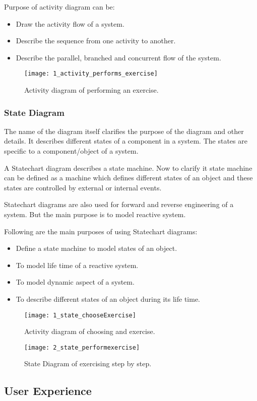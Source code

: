 Purpose of activity diagram can be:
\begin{itemize}
\item Draw the activity flow of a system.
\item Describe the sequence from one activity to another.
\item Describe the parallel, branched and concurrent flow of the system.
\end{itemize}





\begin{figure}[!h]
\centering
\texttt{[image: 1\_activity\_performs\_exercise]}
\caption{Activity diagram of performing an exercise.}\label{activity_performs}
\end{figure}

\clearpage

\subsubsection{State Diagram}
The name of the diagram itself clarifies the purpose of the diagram and other details. It describes different states of a component in a system. The states are specific to a component/object of a system.

A Statechart diagram describes a state machine. Now to clarify it state machine can be defined as a machine which defines different states of an object and these states are controlled by external or internal events.

Statechart diagrams are also used for forward and reverse engineering of a system. But the main purpose is to model reactive system.


Following are the main purposes of using Statechart diagrams:

\begin{itemize}
\item Define a state machine to model states of an object.
\item To model life time of a reactive system.
\item To model dynamic aspect of a system.
\item To describe different states of an object during its life time.
\end{itemize}







\begin{figure}[!h]
\centering
\texttt{[image: 1\_state\_chooseExercise]}
\caption{Activity diagram of choosing and exercise.}\label{state_choose}
\end{figure}

\clearpage

\begin{figure}[!h]
\centering
\texttt{[image: 2\_state\_performexercise]}
\caption{State Diagram of exercising step by step.}\label{state_perform}
\end{figure}

\clearpage

\subsection{User Experience}


\clearpage